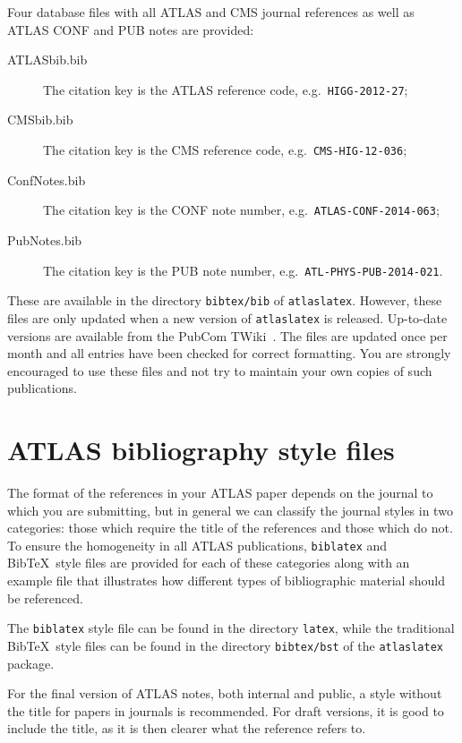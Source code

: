 \documentclass[UKenglish,texlive=2013]{latex/atlasdoc}
\newcommand*{\BibTeX}{Bib\TeX}
\newcommand{\File}[1]{\texttt{#1}\xspace}
\newcommand{\Package}[1]{\texttt{#1}\xspace}
\begin{document}
Four database files with all ATLAS and CMS journal references as well as
ATLAS CONF and PUB notes are provided:
\begin{description}
\item[ATLASbib.bib] The citation key is the ATLAS reference code, e.g.\ \texttt{HIGG-2012-27};
\item[CMSbib.bib] The citation key is the CMS reference code, e.g.\ \texttt{CMS-HIG-12-036};
\item[ConfNotes.bib] The citation key is the CONF note number, e.g.\ \texttt{ATLAS-CONF-2014-063};
\item[PubNotes.bib] The citation key is the PUB note number, e.g.\ \texttt{ATL-PHYS-PUB-2014-021}.
\end{description}
These are available in the directory \File{bibtex/bib} of \Package{atlaslatex}.
However, these files are only updated when a new version of \Package{atlaslatex} is released.
Up-to-date versions are available from the PubCom TWiki~\cite{pubcom-refs}.
The files are updated once per month and all entries have been checked for correct formatting.
You are strongly encouraged to use these files and not try to maintain your own copies of
such publications.

\section{ATLAS bibliography style files}
\label{sec:atlasbst}

The format of the references in your ATLAS paper depends on the journal to which you are submitting,
but in general we can classify the journal styles in two categories: 
those which require the title of the references and those which do not. 
To ensure the homogeneity in all ATLAS publications, 
\Package{biblatex} and \BibTeX\ style files are provided for each of these categories 
along with an example file that illustrates how different types of bibliographic material should be referenced.

The \Package{biblatex} style file can be found in the directory \File{latex},
while the traditional \BibTeX\ style files can be found in the directory \File{bibtex/bst} of the \Package{atlaslatex} package.

For the final version of ATLAS notes, both internal and public, a style without the title for papers in journals is recommended.
For draft versions, it is good to include the title, as it is then clearer what the reference refers to.
\end{document}
